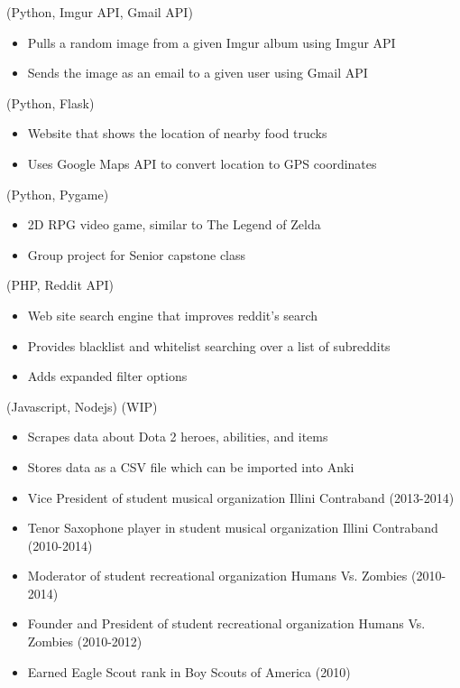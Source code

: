 \documentclass[11pt]{article}
\begin{document}
  \bigskip

  \smallskip

   (Python, Imgur API, Gmail API)
  \begin{itemize}[noitemsep,topsep=0pt]
    \item Pulls a random image from a given Imgur album using Imgur API
    \item Sends the image as an email to a given user using Gmail API
  \end{itemize}
  \medskip

   (Python, Flask)
  \begin{itemize}[noitemsep,topsep=0pt]
    \item Website that shows the location of nearby food trucks
    \item Uses Google Maps API to convert location to GPS coordinates
  \end{itemize}

   (Python, Pygame)
  \begin{itemize}[noitemsep,topsep=0pt]
    \item 2D RPG video game, similar to The Legend of Zelda
    \item Group project for Senior capstone class
  \end{itemize}

   (PHP, Reddit API)
  \begin{itemize}[noitemsep,topsep=0pt]
    \item Web site search engine that improves reddit's search
    \item Provides blacklist and whitelist searching over a list of subreddits
    \item Adds expanded filter options
  \end{itemize}

   (Javascript, Nodejs) (WIP)
  \begin{itemize}[noitemsep,topsep=0pt]
    \item Scrapes data about Dota 2 heroes, abilities, and items
    \item Stores data as a CSV file which can be imported into Anki
  \end{itemize}

  \bigskip

  \begin{itemize}[noitemsep,topsep=0pt]
    \item Vice President of student musical organization Illini Contraband
      \hfill (2013-2014)
    \item Tenor Saxophone player in student musical organization
      Illini Contraband \hfill (2010-2014)
    \item Moderator of student recreational organization Humans Vs. Zombies
      \hfill (2010-2014)
    \item Founder and President of student recreational organization Humans
      Vs. Zombies \hfill (2010-2012)
    \item Earned Eagle Scout rank in Boy Scouts of America \hfill (2010)
  \end{itemize}
\end{document}
